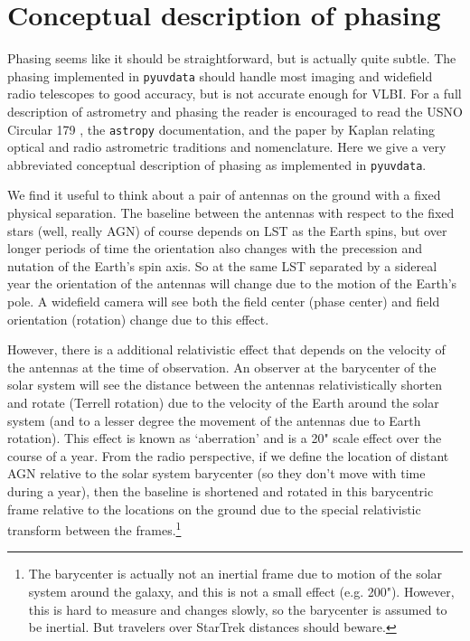 \documentclass[11pt, oneside]{article}   	%
\begin{document}
\section{Conceptual description of phasing}

Phasing seems like it should be straightforward, but is actually quite subtle. The phasing implemented in \texttt{pyuvdata} should handle most imaging and widefield radio telescopes to good accuracy, but is not accurate enough for VLBI. For a full description of astrometry and phasing the reader is encouraged to read the USNO Circular 179 \cite{USNO}, the \texttt{astropy} documentation, and the paper by Kaplan \cite{kaplan1998} relating optical and radio astrometric traditions and nomenclature. Here we give a very abbreviated conceptual description of phasing as implemented in \texttt{pyuvdata}.

We find it useful to think about a pair of antennas on the ground with a fixed physical separation. The baseline between the antennas with respect to the fixed stars (well, really AGN) of course depends on LST as the Earth spins, but over longer periods of time the orientation also changes with the precession and nutation of the Earth's spin axis. So at the same LST separated by a sidereal year the orientation of the antennas will change due to the motion of the Earth's pole. A widefield camera will see both the field center (phase center) and field orientation (rotation) change due to this effect.

However, there is a additional relativistic effect that depends on the velocity of the antennas at the time of observation. An observer at the barycenter of the solar system will see the distance between the antennas relativistically shorten and rotate (Terrell rotation) due to the velocity of the Earth around the solar system (and to a lesser degree the movement of the antennas due to Earth rotation). This effect is known as `aberration' and is a 20" scale effect over the course of a year. From the radio perspective, if we define the location of distant AGN relative to the solar system barycenter (so they don't move with time during a year), then the baseline is shortened and rotated in this barycentric frame relative to the locations on the ground due to the special relativistic transform between the frames.\footnote{The barycenter is actually not an inertial frame due to motion of the solar system around the galaxy, and this is not a small effect (e.g. 200"). However, this is hard to measure and changes slowly, so the barycenter is assumed to be inertial. But travelers over StarTrek distances should beware.} 
\end{document}

